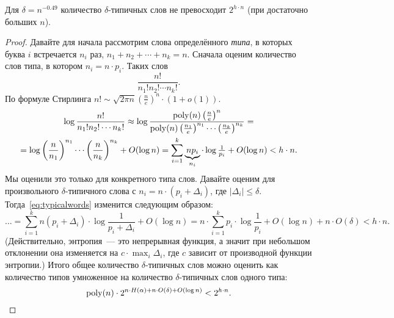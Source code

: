 \documentclass[12pt]{article}
\begin{document}
\begin{lemma}\label{lm:typicalcount}
    Для $\delta = n^{-0.49}$ количество $\delta$-типичных слов не превосходит
    $2^{h\cdot n}$ (при достаточно больших $n$).
\end{lemma}
\begin{proof}
    Давайте для начала рассмотрим слова определённого \emph{типа}, в которых
    буква $i$ встречается $n_i$ раз, $n_1+n_2+\dotsb + n_k = n$. Сначала оценим
    количество слов типа, в котором $n_i = n\cdot p_i$. Таких слов
    \[
        \frac{n!}{n_1!n_2!\dotsm n_k!}.
    \]
    По формуле Стирлинга $n! \sim \sqrt{2\pi n}\left(\frac{n}{e}\right)^n\cdot(1+o(1)).$
    \begin{multline}\label{eq:typicalwords}
        \log \frac{n!}{n_1!n_2!\dotsm n_k!} \approx 
        \log \frac{\mathrm{poly}(n) \left(\frac{n}{e}\right)^n}
            {\mathrm{poly}(n)\left(\frac{n_1}{e}\right)^{n_1}\dotsm
            \left(\frac{n_k}{e}\right)^{n_k}} = \\
        = \log \left(\frac{n}{n_1}\right)^{n_1}\dotsm
            \left(\frac{n}{n_k}\right)^{n_k} + O(\log n) 
        = \sum_{i=1}^k \underbrace{np_i}_{n_i}\cdot
            \log{\textstyle\frac{1}{p_i}} + O(\log n) < h\cdot n.
    \end{multline}
    Мы оценили это только для конкретного типа слов. Давайте оценим для
    произвольного $\delta$-типичного слова с $n_i = n\cdot(p_i + \Delta_i)$,
    где $|\Delta_i| \le \delta$. Тогда~\eqref{eq:typicalwords} изменится следующим образом:
    \[    
        \dots = 
        \sum_{i=1}^k n(p_i + \Delta_i)\cdot
            \log{\textstyle\frac{1}{p_i + \Delta_i}} + O(\log n) =         
        n\cdot \sum_{i=1}^k p_i\cdot
            \log{\textstyle\frac{1}{p_i}} + O(\log n) + n\cdot O(\delta) < h\cdot n. 
    \]
    (Действительно, энтропия~--- это непрерывная функция, а значит при небольшом 
    отклонении она изменяется на $c\cdot \max_i\Delta_i$, где $c$ зависит от производной функции энтропии.)
    Итого общее количество $\delta$-типичных слов можно оценить как количество
    типов умноженное на количество $\delta$-типичных слов одного типа:
    \[
        \mathrm{poly}(n) \cdot 2^{n\cdot H(\alpha) + n\cdot O(\delta) + O(\log n)} <
        2^{h\cdot n}.   
    \]
\end{proof}
\end{document}
